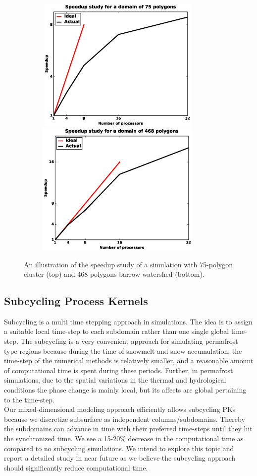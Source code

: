 \documentclass[review]{elsarticle}
\begin{document}
\begin{figure}[!htpb]
\centering
\includegraphics[height = 6.5cm, width=10cm]{figures/speedup-lcs-lobster.eps}
\includegraphics[height = 6.5cm, width=10cm]{figures/speedup-lcs-barrow.eps}
\caption{An illustration of the speedup study of a simulation with 75-polygon cluster (top) and 468 polygons barrow watershed (bottom).}
\label{lcs-speed}
\end{figure}

\subsection{Subcycling Process Kernels}
Subcycling is a multi time stepping approach in simulations. The idea is to assign a suitable local time-step to each subdomain rather than one single global time-step. The subcycling is a very convenient approach for simulating permafrost type regions because during the time of snowmelt and snow accumulation, the time-step of the numerical methods is relatively smaller, and a reasonable amount of computational time is spent during these periods. Further, in permafrost simulations, due to the spatial variations in the thermal and hydrological conditions the phase change is mainly local, but its affects are global pertaining to the time-step. \\
Our mixed-dimensional modeling approach efficiently allows subcycling PKs because we discretize subsurface as independent columns/subdomains. Thereby the subdomains can advance in time with their preferred time-steps until they hit the synchronized time. We see a 15-20\% decrease in the computational time as compared to no subcycling simulations. We intend to explore this topic and report a detailed study in near future as we believe the subcycling approach should significantly reduce computational time.
\end{document}
